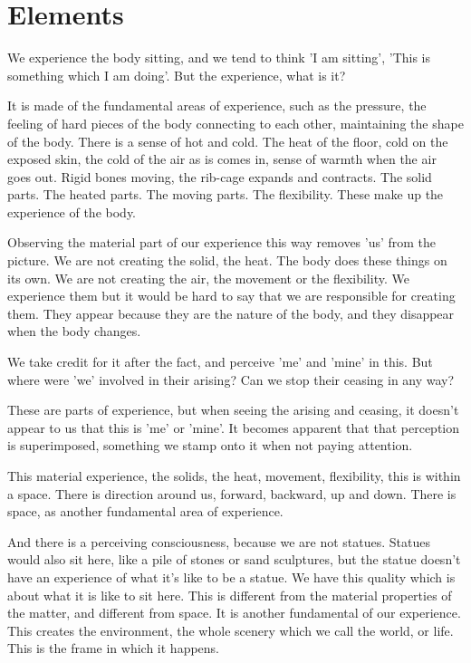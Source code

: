 \hypertarget{elements-1}{%
\chapter{Elements}\label{elements-1}}

We experience the body sitting, and we tend to think 'I am sitting',
'This is something which I am doing'. But the experience, what is it?

It is made of the fundamental areas of experience, such as the pressure,
the feeling of hard pieces of the body connecting to each other,
maintaining the shape of the body. There is a sense of hot and cold. The
heat of the floor, cold on the exposed skin, the cold of the air as is
comes in, sense of warmth when the air goes out. Rigid bones moving, the
rib-cage expands and contracts. The solid parts. The heated parts. The
moving parts. The flexibility. These make up the experience of the body.

Observing the material part of our experience this way removes 'us' from
the picture. We are not creating the solid, the heat. The body does
these things on its own. We are not creating the air, the movement or
the flexibility. We experience them but it would be hard to say that we
are responsible for creating them. They appear because they are the
nature of the body, and they disappear when the body changes.

We take credit for it after the fact, and perceive 'me' and 'mine' in
this. But where were 'we' involved in their arising? Can we stop their
ceasing in any way?

These are parts of experience, but when seeing the arising and ceasing,
it doesn't appear to us that this is 'me' or 'mine'. It becomes apparent
that that perception is superimposed, something we stamp onto it when
not paying attention.

This material experience, the solids, the heat, movement, flexibility,
this is within a space. There is direction around us, forward, backward,
up and down. There is space, as another fundamental area of experience.

And there is a perceiving consciousness, because we are not statues.
Statues would also sit here, like a pile of stones or sand sculptures,
but the statue doesn't have an experience of what it's like to be a
statue. We have this quality which is about what it is like to sit here.
This is different from the material properties of the matter, and
different from space. It is another fundamental of our experience. This
creates the environment, the whole scenery which we call the world, or
life. This is the frame in which it happens.

